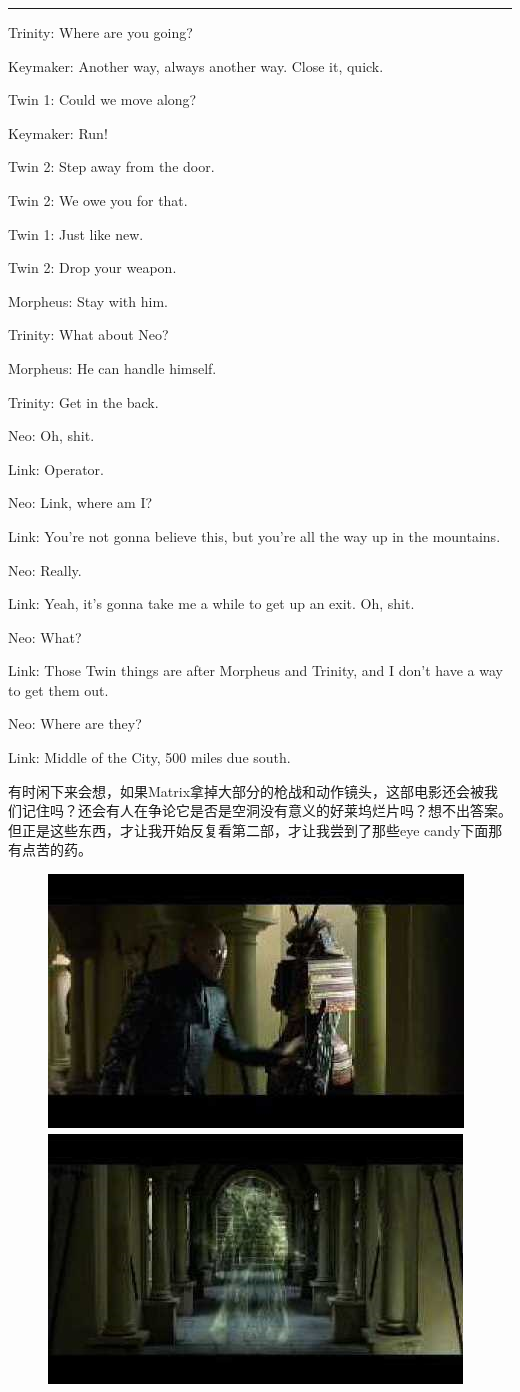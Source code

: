 \documentclass{ctexart}
\newcommand{\myparsep}{\noindent \rule[0.5ex]{\linewidth}{1pt}}
\newenvironment{myquote}{\color{green} \setlength{\leftskip}{6em} \setlength{\rightskip}{4em} \setlength{\parindent}{-2em}}{\par}
\begin{document}
\myparsep

\begin{myquote}
Trinity: Where are you going?

Keymaker: Another way, always another way. Close it, quick.

Twin 1: Could we move along?

Keymaker: Run!

Twin 2: Step away from the door.

Twin 2: We owe you for that.

Twin 1: Just like new.

Twin 2: Drop your weapon.

Morpheus: Stay with him.

Trinity: What about Neo?

Morpheus: He can handle himself.

Trinity: Get in the back.

Neo: Oh, shit.

Link: Operator.

Neo: Link, where am I?

Link: You're not gonna believe this, but you're all the way up in the mountains.

Neo: Really.

Link: Yeah, it's gonna take me a while to get up an exit. Oh, shit.

Neo: What?

Link: Those Twin things are after Morpheus and Trinity, and I don't have a way to get them out.

Neo: Where are they?

Link: Middle of the City, 500 miles due south.
\end{myquote}

有时闲下来会想，如果Matrix拿掉大部分的枪战和动作镜头，这部电影还会被我们记住吗？还会有人在争论它是否是空洞没有意义的好莱坞烂片吗？想不出答案。但正是这些东西，才让我开始反复看第二部，才让我尝到了那些eye candy下面那有点苦的药。

\begin{figure}[htb]
\centering
\includegraphics[width=0.45\linewidth]{fig/read_reloaded-126}
\includegraphics[width=0.45\linewidth]{fig/read_reloaded-127}
\end{figure}
\end{document}
